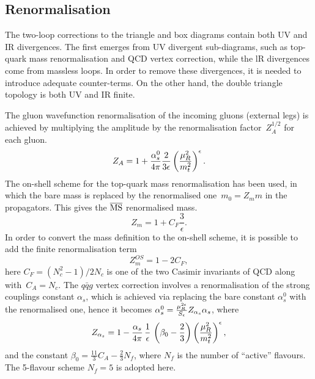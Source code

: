 \subsection{Renormalisation}
\label{subsec:ren}
The two-loop corrections to the triangle and box diagrams contain both UV and IR divergences. The first emerges from UV divergent sub-diagrams, such as top-quark mass renormalisation and QCD vertex correction, while the lR divergences come from massless loops. In order to remove these divergences, it is needed to introduce adequate counter-terms.  On the other hand, the double triangle topology is both UV and IR finite.
\par The gluon wavefunction renormalisation of the incoming gluons (external legs) is achieved by multiplying the amplitude by the renormalisation factor~$ Z_A^{1/2}$ for each gluon.
\begin{equation}
	Z_A= 1+\frac{\alpha_s^0}{4 \pi} \frac{2}{3\epsilon} \left( \frac{\mu_R^2}{m_t^2} \right) ^\epsilon.
\end{equation}
The on-shell scheme for the top-quark mass renormalisation has been used, in which the bare mass is replaced by the renormalised one~$ m_0 = Z_m m$  in the propagators. This gives the $\overline{\mathrm{MS}}$ renormalised mass. 
\begin{equation}
	Z_m = 1+ C_F \frac{3}{\epsilon}.
\end{equation}
In order to convert the mass definition to the on-shell scheme, it is possible to add the finite renormalisation term
\begin{equation}
	Z^{OS}_m = 1- 2 C_F,
\end{equation}
here $C_F=(N_c^2-1)/2N_c$ is one of the two Casimir invariants of QCD along with~$ C_A=N_c$. 
The $q \bar q g$ vertex correction involves a renormalisation of the strong couplings constant $ \alpha_s$, which is achieved via replacing the bare constant $\alpha_s^0$ with the renormalised one, hence it becomes  $ \alpha^0_s = \frac{\mu_R^{2\epsilon}}{S_\epsilon}  Z_{\alpha_s} \alpha_s$, where
\begin{equation}
	Z_{\alpha_s} = 1- \frac{\alpha_s}{4 \pi} \, \frac{1}{ \epsilon}\,  \left( \beta_0-\frac{2}{3} \right) \left(\frac{\mu_R^2}{m_t^2} \right) ^\epsilon,
\end{equation}
and the constant $ \beta_0 = \frac{11}{3} C_A -\frac{2}{3}N_f$, where $N_f$ is the number of ``active'' flavours. The 5-flavour scheme $N_f=5$ is adopted here. 
